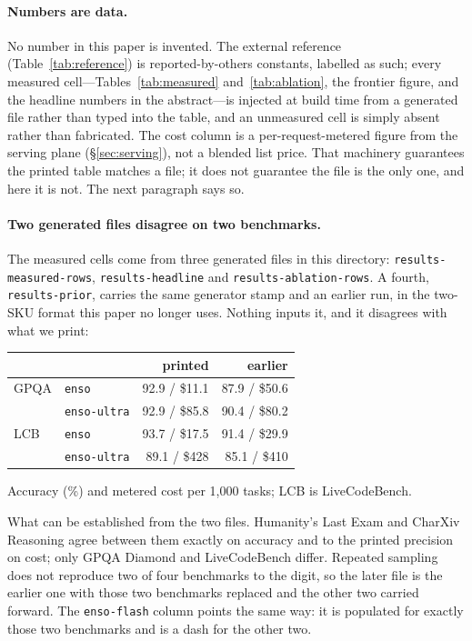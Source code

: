 \documentclass[11pt]{article}
\begin{document}
\paragraph{Numbers are data.} No number in this paper is invented. The external
reference (Table~\ref{tab:reference}) is reported-by-others constants, labelled as
such; every measured cell---Tables~\ref{tab:measured} and~\ref{tab:ablation}, the
frontier figure, and the headline numbers in the abstract---is injected at build
time from a generated file rather than typed into the table, and an unmeasured cell
is simply absent rather than fabricated. The cost column is a per-request-metered
figure from the serving plane (\S\ref{sec:serving}), not a blended list price. That
machinery guarantees the printed table matches a file; it does not guarantee the
file is the only one, and here it is not. The next paragraph says so.

\paragraph{Two generated files disagree on two benchmarks.} The measured cells
come from three generated files in this directory:
\texttt{results-measured-rows}, \texttt{results-headline} and
\texttt{results-ablation-rows}. A fourth, \texttt{results-prior}, carries the same
generator stamp and an earlier run, in the two-SKU format this paper no longer
uses. Nothing inputs it, and it disagrees with what we print:

\begin{center}\footnotesize\setlength{\tabcolsep}{3pt}
\begin{tabular}{@{}llrr@{}}
\toprule
& & printed & earlier \\
\midrule
GPQA & \texttt{enso}       & 92.9 / \$11.1 & 87.9 / \$50.6 \\
     & \texttt{enso-ultra} & 92.9 / \$85.8 & 90.4 / \$80.2 \\
LCB  & \texttt{enso}       & 93.7 / \$17.5 & 91.4 / \$29.9 \\
     & \texttt{enso-ultra} & 89.1 / \$428  & 85.1 / \$410 \\
\bottomrule
\end{tabular}
\end{center}
\noindent Accuracy (\%) and metered cost per 1{,}000 tasks; LCB is
LiveCodeBench.

\noindent What can be established from the two files. Humanity's Last Exam and
CharXiv Reasoning agree between them exactly on accuracy and to the printed
precision on cost; only GPQA Diamond and LiveCodeBench differ. Repeated sampling
does not reproduce two of four benchmarks to the digit, so the later file is the
earlier one with those two benchmarks replaced and the other two carried forward.
The \texttt{enso-flash} column points the same way: it is populated for exactly
those two benchmarks and is a dash for the other two.
\end{document}
